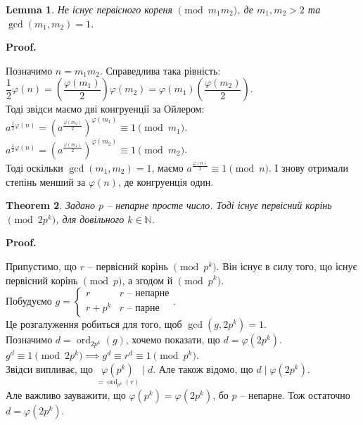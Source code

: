 \documentclass[a4paper, 10pt]{article}
\makeatletter
\theoremstyle{theoremdd}
\newtheorem{theorem}{Theorem}[subsection]
\theoremstyle{theoremdd}
\theoremstyle{theoremdd}
\theoremstyle{theoremdd}
\theoremstyle{theoremdd}
\theoremstyle{theoremdd}
\theoremstyle{theoremdd}
\newtheorem{lemma}[theorem]{Lemma}
\theoremstyle{theoremdd}
\renewenvironment{proof}[1][Proof.\\]{\par
\pushQED{\hfill \qed}%
\normalfont \topsep6\p@\@plus6\p@\relax
\trivlist
\item\relax
{\bfseries
#1\@addpunct{.}}\hspace\labelsep\ignorespaces
}{%
\popQED\endtrivlist\@endpefalse
}
\DeclareMathOperator{\ord}{ord}
\makeatother
\begin{document}
\begin{lemma}
Не існує первісного кореня $\!\! \pmod {m_1m_2}$, де $m_1,m_2 > 2$ та $\gcd(m_1,m_2) = 1$.
\end{lemma}

\begin{proof}
Позначимо $n = m_1m_2$. Справедлива така рівність:\\
$\dfrac{1}{2} \varphi(n) = \left(\dfrac{\varphi(m_1)}{2} \right) \varphi(m_2) = \varphi(m_1) \left( \dfrac{\varphi(m_2)}{2} \right)$.\\
Тоді звідси маємо дві конгруенції за Ойлером:\\
$a^{\frac{1}{2} \varphi(n)} = \left(a^{\frac{\varphi(m_2)}{2}} \right)^{\varphi(m_1)} \equiv 1 \pmod {m_1}$.\\
$a^{\frac{1}{2} \varphi(n)} = \left(a^{\frac{\varphi(m_1)}{2}} \right)^{\varphi(m_2)} \equiv 1 \pmod {m_2}$.\\
Тоді оскільки $\gcd(m_1,m_2) = 1$, маємо $a^{\frac{\varphi(n)}{2}} \equiv 1 \pmod {n}$. І знову отримали степінь менший за $\varphi(n)$, де конгруенція один.
\end{proof}

\begin{theorem}
Задано $p$ -- непарне просте число. Тоді існує первісний корінь $\!\! \pmod {2p^k}$, для довільного $k \in \mathbb{N}$.
\end{theorem}

\begin{proof}
Припустимо, що $r$ -- первісний корінь $\!\! \pmod {p^k}$. Він існує в силу того, що існує первісний корінь $\!\! \pmod p$, а згодом й $\!\! \pmod {p^k}$.\\
Побудуємо $g = \begin{cases} r & r \text{ -- непарне} \\ r+p^k & r \text{ -- парне} \end{cases}$. \\
Це розгалуження робиться для того, щоб $\gcd(g,2p^k) = 1$.\\
Позначимо $d = \ord_{2p^k}(g)$, хочемо показати, що $d = \varphi(2p^k)$.\\
$g^d \equiv 1 \pmod {2p^k} \implies g^d \equiv r^d \equiv 1 \pmod {p^k}$.\\
Звідси випливає, що $\underset{=\ord_{p^k}(r)}{\varphi(p^k)} \mid d$. Але також відомо, що $d \mid \varphi(2p^k)$.\\
Але важливо зауважити, що $\varphi(p^k) = \varphi(2p^k)$, бо $p$ -- непарне. Тож остаточно $d = \varphi(2p^k)$.
\end{proof}
\end{document}

